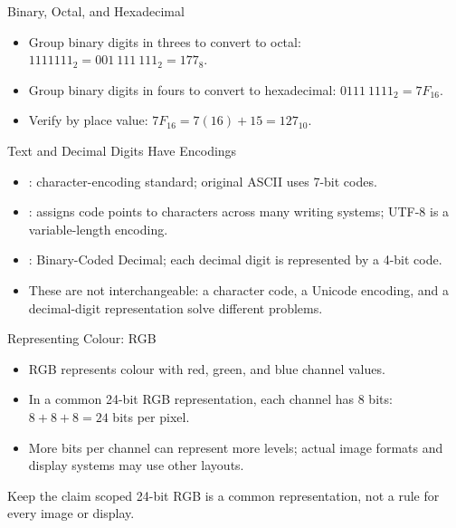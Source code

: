 \documentclass[aspectratio=169]{beamer}
\begin{document}
\begin{frame}{Binary, Octal, and Hexadecimal}
  \begin{itemize}
    \item Group binary digits in threes to convert to octal:
      $1111111_2 = 001\ 111\ 111_2 = 177_8$.
    \item Group binary digits in fours to convert to hexadecimal:
      $0111\ 1111_2 = 7F_{16}$.
    \item Verify by place value: $7F_{16}=7(16)+15=127_{10}$.
  \end{itemize}
\end{frame}

\begin{frame}{Text and Decimal Digits Have Encodings}
  \begin{itemize}
    \item {}: character-encoding standard; original ASCII uses 7-bit
      codes.
    \item {}: assigns code points to characters across many
      writing systems; UTF-8 is a variable-length encoding.
    \item {}: Binary-Coded Decimal; each decimal digit is represented
      by a 4-bit code.
    \item These are not interchangeable: a character code, a Unicode
      encoding, and a decimal-digit representation solve different problems.
  \end{itemize}
\end{frame}

\begin{frame}{Representing Colour: RGB}
  \begin{itemize}
    \item RGB represents colour with red, green, and blue channel values.
    \item In a common 24-bit RGB representation, each channel has 8 bits:
      $8+8+8=24$ bits per pixel.
    \item More bits per channel can represent more levels; actual image
      formats and display systems may use other layouts.
  \end{itemize}
  \begin{block}{Keep the claim scoped}
    24-bit RGB is a common representation, not a rule for every image or
    display.
  \end{block}
\end{frame}
\end{document}
